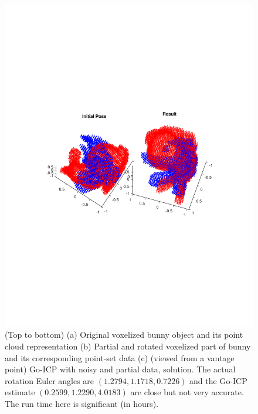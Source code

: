 \documentclass{UCF_ETD}
\begin{document}
\begin{figure}[H]
\begin{center}
\includegraphics[scale=0.7]{RobustRegistration/GoICPBunnyResults}
\caption{  (Top to bottom) (a) Original voxelized bunny object and its point cloud representation (b) Partial and rotated voxelized part of bunny and its corresponding point-set data  (c) (viewed from a vantage point)  Go-ICP with noisy and partial data, solution. The actual rotation Euler angles are $(1.2794,   1.1718, 0.7226)$ and the Go-ICP estimate $(0.2599 ,1.2290, 4.0183)$ are close but not very accurate.  The run time here is significant (in hours). }
\label{FailureOfICP.fig}
\end{center}
\end{figure}
\end{document}
